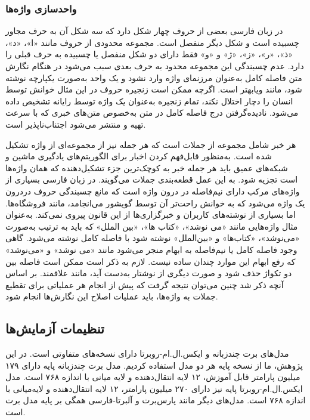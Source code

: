 \subsubsection[واحدسازی واژه‌ها]{واحدسازی واژه‌ها}
در زبان فارسی بعضی از حروف چهار شکل دارد که سه شکل آن به حرف مجاور چسبیده است و شکل دیگر منفصل است. مجموعه محدودی از حروف مانند «ا»، «د»، «ذ»، «ر»، «ز»، «ژ» و «و» فقط دارای دو شکل منفصل یا چسبیده به حرف قبلی را دارد. عدم چسبندگی این مجموعه محدود به حرف بعدی سبب می‌شود در هنگام نگارش  متن فاصله کامل به‌عنوان مرزنمای واژه وارد نشود و یک واحد به‌صورت یکپارچه نوشته شود، مانند ویابهتر است. اگرچه ممکن است زنجیره حروف در این مثال خوانش توسط انسان را دچار اختلال نکند، تمام زنجیره به‌عنوان یک واژه توسط رایانه تشخیص داده می‌شود.  نادیده‌گرفتن درج فاصله کامل در متن به‌خصوص متن‌های خبری که با سرعت تهیه و منتشر می‌شود اجتناب‌ناپذیر است.

هر خبر شامل مجموعه از جملات است که هر جمله نیز از مجموعه‌ای از واژه تشکیل شده‌ است. به‌منظور قابل‌فهم کردن اخبار برای الگوریتم‌های یادگیری ماشین و شبکه‌های عمیق باید هر جمله خبر به کوچک‌ترین جزء تشکیل‌دهنده که همان واژه‌ها است تجزیه شود. به این عمل قطعه‌بندی جملات می‌گویند. در زبان فارسی بسیاری از واژه‌های مرکب دارای نیم‌فاصله در درون واژه است که مانع چسبندگی حروف دردرون یک واژه می‌شود که به خوانش راحت‌تر آن توسط گویشور می‌انجامد، مانند فروشگاه‌ها. اما بسیاری از نوشته‌های کاربران و خبرگزاری‌ها از این قانون پیروی نمی‌کند. به‌عنوان مثال واژه‌هایی مانند «می نوشد»، «کتاب ها»، «بین الملل» که باید به ترتیب به‌صورت «می‌نوشد»، «کتاب‌ها» و «بین‌الملل» نوشته شود با فاصله کامل نوشته می‌شود. گاهی وجود فاصله کامل یا نیم‌فاصله به ابهام منجر می‌شود مانند «می نوشد» و «می‌نوشد» که رفع ابهام این موارد چندان ساده نیست. لازم به ذکر است ممکن است فاصله بین دو تکواژ حذف شود و صورت دیگری از نوشتار به‌دست آید، مانند علاقمند. بر اساس آنچه ذکر شد چنین می‌توان نتیجه گرفت که پیش از انجام هر عملیاتی برای تقطیع جملات به واژه‌ها، باید عملیات اصلاح این نگارش‌ها انجام شود.

\subsection{تنظیمات آزمایش‌ها}
مدل‌های برت چندزبانه و ایکس.ال.ام-روبرتا دارای نسخه‌های متفاوتی است. در این پژوهش، ما از نسخه‌ پایه هر دو مدل استفاده کردیم. مدل برت چند‌زبانه پایه دارای ۱۷۹ میلیون پارامتر قابل آموزش، ۱۲ لایه انتقال‌دهنده و لایه میانی با اندازه ۷۶۸ است. مدل ایکس.ال.ام-روبرتا پایه نیز دارای ۲۷۰ میلیون پارامتر، ۱۲ لایه انتقال‌دهنده و لایه‌میانی با اندازه ۷۶۸ است. مدل‌های دیگر مانند پارس‌برت و آلبرتا-فارسی همگی بر پایه مدل برت است.

